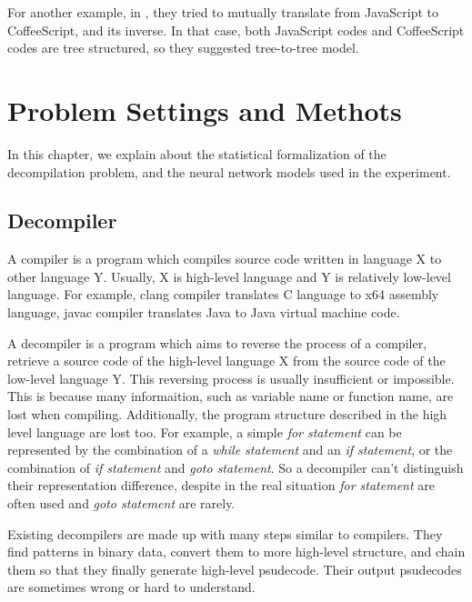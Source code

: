 \documentclass[senior,final,11pt]{iscs-thesis}
\begin{document}
For another example, in \cite{coffeescript_to_javascript}, they tried to mutually translate from JavaScript to CoffeeScript, and its inverse.
In that case, both JavaScript codes and CoffeeScript codes are tree structured, so they suggested tree-to-tree model.


\chapter{Problem Settings and Methots}

In this chapter, we explain about the statistical formalization of the decompilation problem,
and the neural network models used in the experiment.
\section{Decompiler}


A compiler is a program which compiles source code written in language X to other language Y. 
Usually, X is high-level language and Y is relatively low-level language. 
For example, clang compiler translates C language to x64 assembly language, javac compiler translates Java to Java virtual machine code.

A decompiler is a program which aims to reverse the process of a compiler, retrieve a source code of the high-level language X from the source code of the low-level language Y. 
This reversing process is usually insufficient or impossible.
This is because many informaition, such as variable name or function name, are lost when compiling.
Additionally, the program structure described in the high level language are lost too. 
For example, a simple {\sl for statement} can be represented by the combination of a {\sl while statement} and an {\sl if statement}, or the combination of {\sl if statement} and {\sl goto statement}. 
So a decompiler can't distinguish their representation difference, despite in the real situation {\sl for statement} are often used and {\sl goto statement} are rarely. 

Existing decompilers are made up with many steps similar to compilers. 
They find patterns in binary data, convert them to more high-level structure, and chain them so that they finally generate high-level psudecode.
Their output psudecodes are sometimes wrong or hard to understand.

\end{document}
